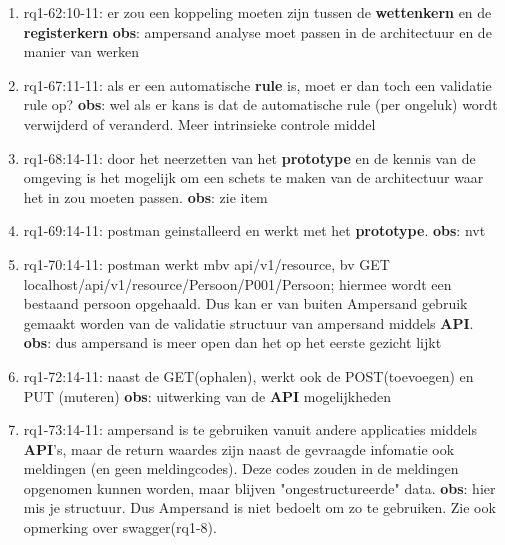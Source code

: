 \begin{enumerate}
    \item rq1-62:10-11: er zou een koppeling moeten zijn tussen de \textbf{wettenkern} en de \textbf{registerkern}
    \newline\textbf{obs}: ampersand analyse moet passen in de architectuur en de manier van werken
    
    \item rq1-67:11-11: als er een automatische \textbf{rule} is, moet er dan toch een validatie rule op?
    \newline\textbf{obs}: wel als er kans is dat de automatische rule (per ongeluk) wordt verwijderd of veranderd.
    Meer intrinsieke controle middel
    
    \item rq1-68:14-11: door het neerzetten van het \textbf{prototype} en de kennis van de omgeving is het mogelijk om een schets te maken van de architectuur waar het in zou moeten passen.
    \newline\textbf{obs}: zie item
    
    \item rq1-69:14-11: postman geinstalleerd en werkt met het \textbf{prototype}.
    \newline\textbf{obs}: nvt
    
    \item rq1-70:14-11: postman werkt mbv api/v1/resource, bv GET localhost/api/v1/resource/Persoon/P001/Persoon; 
    hiermee wordt een bestaand persoon opgehaald. 
    Dus kan er van buiten Ampersand gebruik gemaakt worden van de validatie structuur van ampersand middels \textbf{API}.
    \newline\textbf{obs}: dus ampersand is meer open dan het op het eerste gezicht lijkt
    
    \item rq1-72:14-11: naast de GET(ophalen), werkt ook de POST(toevoegen) en PUT (muteren)
    \newline\textbf{obs}: uitwerking van de \textbf{API} mogelijkheden
    
    \item rq1-73:14-11: ampersand is te gebruiken vanuit andere applicaties middels \textbf{API}'s, maar de return waardes zijn naast de gevraagde infomatie ook meldingen (en geen meldingcodes). Deze codes zouden in de meldingen opgenomen kunnen worden, maar blijven "ongestructureerde" data.
    \newline\textbf{obs}: hier mis je structuur. 
    Dus Ampersand is niet bedoelt om zo te gebruiken. 
    Zie ook opmerking over swagger(rq1-8).
    

\end{enumerate}
